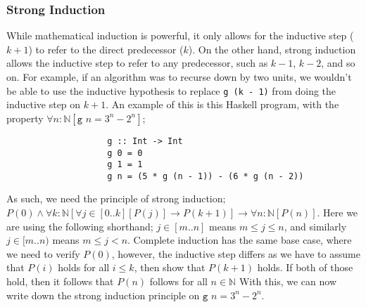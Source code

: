 \documentclass[a4paper, 12pt]{article}
\begin{document}
            \subsubsection*{Strong Induction}
                While mathematical induction is powerful, it only allows for the inductive step ($k + 1$) to refer to the direct predecessor ($k$). On the other hand, strong induction allows the inductive step to refer to any predecessor, such as $k - 1$, $k - 2$, and so on. For example, if an algorithm was to recurse down by two units, we wouldn't be able to use the inductive hypothesis to replace \texttt{g (k - 1)} from doing the inductive step on $k + 1$. An example of this is this Haskell program, with the property $\forall n : \mathbb{N} [\texttt{g } n = 3^n - 2^n]$;
                \begin{lstlisting}
                    g :: Int -> Int
                    g 0 = 0
                    g 1 = 1
                    g n = (5 * g (n - 1)) - (6 * g (n - 2))
                \end{lstlisting}
                As such, we need the principle of strong induction; $P(0) \land \forall k : \mathbb{N} [\forall j \in [0..k] [P(j)] \rightarrow P(k + 1)] \rightarrow \forall n : \mathbb{N} [P(n)]$. Here we are using the following shorthand; $j \in [m..n]$ means $m \leq j \leq n$, and similarly $j \in [m..n)$ means $m \leq j < n$. Complete induction has the same base case, where we need to verify $P(0)$, however, the inductive step differs as we have to assume that $P(i)$ holds for all $i \leq k$, then show that $P(k + 1)$ holds. If both of those hold, then it follows that $P(n)$ follows for all $n \in \mathbb{N}$ With this, we can now write down the strong induction principle on $\texttt{g } n = 3^n - 2^n$.
                \medskip
\end{document}
